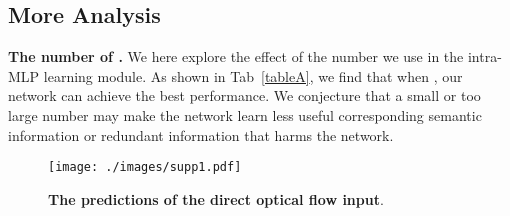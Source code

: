 \documentclass[journal]{IEEEtran}
\begin{document}
\subsection{More Analysis}

\noindent \textbf{The number of .} We here explore the effect of the  number we use in the intra-MLP learning module. As shown in Tab~\ref{tableA}, we find that when , our network can achieve the best performance. We conjecture that a small or too large  number may make the network learn less useful corresponding semantic information or redundant information that harms the network.

\vspace{1ex}

\begin{figure}[t]
	\begin{center}
		\centering
		\texttt{[image: ./images/supp1.pdf]}
	\end{center}
	\caption{\textbf{The predictions of the direct optical flow input}.}
	\label{figA}
\end{figure}



\begin{table}[t]
    \centering
   
            \vspace{6pt}
            \caption{Analysis of the  number in intra-MLP learning module.}\label{tableA}
		    
\end{table}
\end{document}
